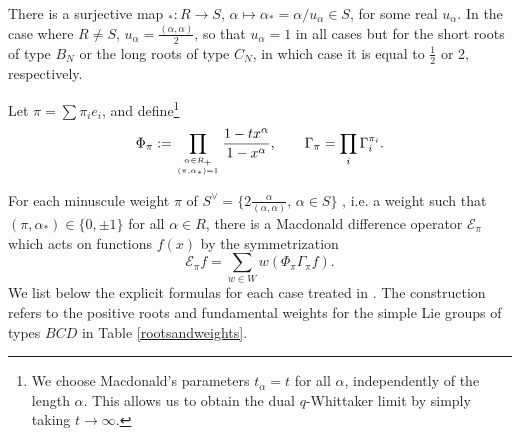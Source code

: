 \documentclass[12pt]{amsart}
\newcommand{\al}{{\alpha}}
\numberwithin{equation}{section}
\begin{document}
There is a surjective map ${}_*: { R}\to { S}$, $\al\mapsto \al_*=\al/u_\al\in S$, for some real $u_\al$. 
In the case where $R\neq S$, $u_\al=\frac{(\al,\al)}{2}$, so that $u_\al=1$ in all cases but for the short roots of type $B_N$ or the long roots of type $C_N$, in which case it is equal to $\frac12$ or 2, respectively.

%
Let $\pi=\sum \pi_i e_i$, and define\footnote{We choose Macdonald's parameters $t_\al=t$ for all $\alpha$,
independently of the length $\al$. This allows us to obtain the dual $q$-Whittaker limit by simply taking $t\to\infty$.}
\begin{equation}\label{macphi}
\Phi_\pi:=\prod_{\al\in { R}_+\atop (\pi,\al_*)=1}\frac{1-t x^\al}{1-x^\al} , \qquad \Gamma_\pi=\prod_i \Gamma_i^{\pi_i}.
\end{equation}
%


%
%
%
%
%
%
For each minuscule weight $\pi$ of ${S}^\vee=\{ 2\frac{\al}{(\al,\al)}, \, \al\in S\}$ , i.e. a weight such that $(\pi,\al_*)\in \{0, \pm1\}$
for all $\al\in { R}$, there is a Macdonald difference operator ${\mathcal E}_\pi$ which acts on functions $f(x)$ by the symmetrization
\begin{equation}\label{macmac}{\mathcal E}_\pi f=\sum_{w\in W}w\left(\Phi_\pi \Gamma_\pi f \right).
\end{equation}
We list below the explicit formulas for each case treated in \cite{macdoroot}.
The construction refers to the positive roots and fundamental weights for the simple Lie groups of types $BCD$ in Table \ref{rootsandweights}.

%
%
%
%
%
%
%
%
%
%
%
%
%
%
%
%
%
%
%
%
%
%
%
%
\end{document}
